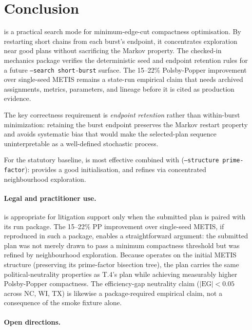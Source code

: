 \section{Conclusion}
\label{sec:conclusion}

\shb{} is a practical search mode for minimum-edge-cut compactness
optimisation.
By restarting short \recom{} chains from each burst's endpoint, it
concentrates exploration near good plans without sacrificing the
Markov property.
The checked-in mechanics package verifies the deterministic seed and endpoint
retention rules for a future \texttt{--search short-burst} surface.  The
15--22\% Polsby-Popper improvement over single-seed METIS remains a
state-run empirical claim that needs archived assignments, metrics, parameters,
and lineage before it is cited as production evidence.

The key correctness requirement is \emph{endpoint retention} rather
than within-burst minimization: retaining the burst endpoint
preserves the Markov restart property and avoids systematic bias
that would make the selected-plan sequence uninterpretable as a
well-defined stochastic process.

For the statutory baseline, \shb{} is most effective combined with
\ar{} (\texttt{--structure prime-factor}): \ar{} provides a good
initialisation, and \shb{} refines via concentrated neighbourhood
exploration.

\paragraph{Legal and practitioner use.}
\shb{} is appropriate for litigation support only when the submitted plan is
paired with its run package.  The 15--22\% PP improvement over single-seed
METIS, if reproduced in such a package, enables a straightforward argument:
the submitted plan was not merely drawn to pass a minimum compactness threshold
but was refined by neighbourhood exploration.
Because \shb{} operates on the initial METIS structure (preserving its
prime-factor bisection tree), the plan carries the same political-neutrality
properties as T.4's \ar{} plan while achieving measurably higher
Polsby-Popper compactness.
The efficiency-gap neutrality claim ($|\mathrm{EG}| < 0.05$ across NC, WI, TX)
is likewise a package-required empirical claim, not a consequence of the smoke
fixture alone.

\paragraph{Open directions.}

